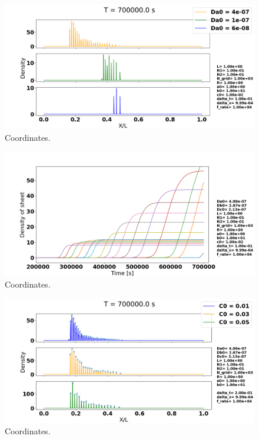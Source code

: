 \documentclass[1p]{elsarticle}        	%
\begin{document}
\begin{figure}
	\centering
	\includegraphics[width=\linewidth]{../figures/Da0_same_ratio.png}
	\caption{Coordinates.}
	\label{fig:coords}
\end{figure}

\begin{figure}
	\centering
	\includegraphics[width=\linewidth]{../figures/peak_growth.png}
	\caption{Coordinates.}
	\label{fig:coords}
\end{figure}

\begin{figure}
	\centering
	\includegraphics[width=\linewidth]{../figures/deltaC0_s.png}
	\caption{Coordinates.}
	\label{fig:coords}
\end{figure}
\end{document}
